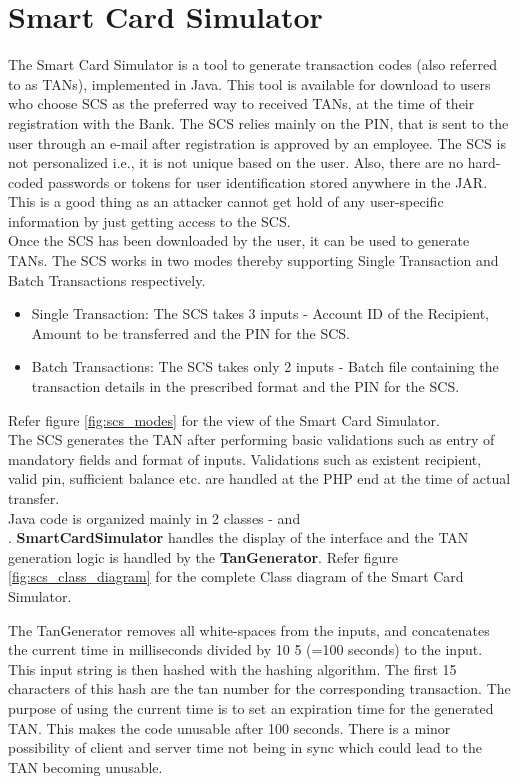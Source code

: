 \section{Smart Card Simulator} \label{section_scs}

The Smart Card Simulator is a tool to generate transaction codes (also referred to as TANs), implemented in Java. This tool is available for download to users who choose SCS as the preferred way to received TANs, at the time of their registration with the Bank. The SCS relies mainly on the PIN, that is sent to the user through an e-mail after registration is approved by an employee.
The SCS is not personalized i.e., it is not unique based on the user. Also, there
are no hard-coded passwords or tokens for user identification stored anywhere in
the JAR. This is a good thing as an attacker cannot get hold of any user-specific
information by just getting access to the SCS. \\

Once the SCS has been downloaded by the user, it can be used to generate TANs. The SCS works in two modes thereby supporting Single Transaction and Batch Transactions respectively.
\begin{itemize}
\item Single Transaction: The SCS takes 3 inputs - Account ID of the Recipient, Amount to be transferred and the PIN for the SCS. 
\item Batch Transactions: The SCS takes only 2 inputs - Batch file containing the transaction details in the prescribed format and the PIN for the SCS.
\end{itemize}
Refer figure \ref{fig:scs_modes} for the view of the Smart Card Simulator. \\

The SCS generates the TAN after performing basic validations such as entry of mandatory fields and format of inputs. Validations such as existent recipient, valid pin, sufficient balance etc. are handled at the PHP end at the time of actual transfer. \\

Java code is organized mainly in 2 classes -  and \\ . \textbf{SmartCardSimulator} handles the display of the interface and the TAN generation logic is handled by the \textbf{TanGenerator}.
Refer figure \ref{fig:scs_class_diagram} for the complete Class diagram of the Smart Card Simulator.


The TanGenerator removes all white-spaces from the inputs, and concatenates the current time in milliseconds divided by 10 5 (=100 seconds) to the input. This input string is then hashed with the  hashing
algorithm. The first 15 characters of this hash are the tan number for the corresponding transaction.
The purpose of using the current time is to set an expiration time for the generated TAN. This makes the code unusable after 100 seconds. There is a minor possibility of client and server time not being in sync which could lead to the TAN becoming unusable. \\

